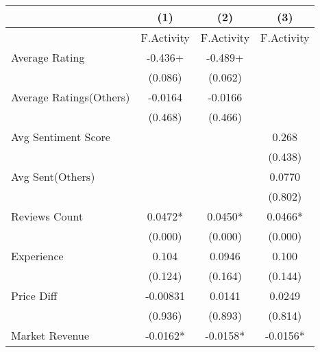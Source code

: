 \begin{table}[]
\centering
\begin{tabular}{@{}lccc@{}}
\toprule
                                                           & (1)        & (2)        & (3)        \\ \midrule
                                                           & F.Activity & F.Activity & F.Activity \\
Average Rating                                             & -0.436+    & -0.489+    &            \\
                                                           & (0.086)    & (0.062)    &            \\
Average Ratings(Others)                                    & -0.0164    & -0.0166    &            \\
                                                           & (0.468)    & (0.466)    &            \\
Avg Sentiment Score                                        &            &            & 0.268      \\
                                                           &            &            & (0.438)    \\
Avg Sent(Others)                                           &            &            & 0.0770     \\
                                                           &            &            & (0.802)    \\
Reviews Count                                              & 0.0472*    & 0.0450*    & 0.0466*    \\
                                                           & (0.000)    & (0.000)    & (0.000)    \\
Experience                                                 & 0.104      & 0.0946     & 0.100      \\
                                                           & (0.124)    & (0.164)    & (0.144)    \\
Price Diff                                                 & -0.00831   & 0.0141     & 0.0249     \\
                                                           & (0.936)    & (0.893)    & (0.814)    \\
Market Revenue                                             & -0.0162*   & -0.0158*   & -0.0156*   \\

\end{tabular}
\end{table}
